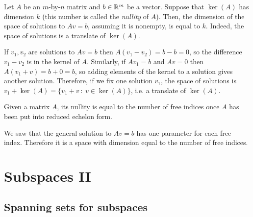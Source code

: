 \documentclass{article}
\begin{document}
\begin{Theorem}
Let \(A\) be an \(m\)-by-\(n\) matrix and \(b\in\mathbb{R}^m\) be a
vector. Suppose that \(\ker(A)\) has dimension \(k\) (this number is
called the {\em nullity} of \(A\)). Then, the dimension of the space
of solutions to \(Av=b\), assuming it is nonempty, is equal to
\(k\). Indeed, the space of solutions is a translate of \(\ker(A)\).
\end{Theorem}
\begin{Proof}
If \(v_1,v_2\) are solutions to \(Av=b\) then \(A(v_1-v_2)=b-b=0\),
so the difference \(v_1-v_2\) is in the kernel of \(A\). Similarly,
if \(Av_1=b\) and \(Av=0\) then \(A(v_1+v)=b+0=b\), so adding
elements of the kernel to a solution gives another
solution. Therefore, if we fix one solution \(v_1\), the space of
solutions is \(v_1+\ker(A)=\{v_1+v\ :\ v\in\ker(A)\}\), i.e. a
translate of \(\ker(A)\). \qedhere


\end{Proof}
\begin{Theorem}\label{thm:nullity}
Given a matrix \(A\), its nullity is equal to the number of free
indices once \(A\) has been put into reduced echelon form.
\end{Theorem}
\begin{Proof}
We saw that the general solution to \(Av=b\) has one parameter for
each free index. Therefore it is a space with dimension equal to the
number of free indices. \qedhere


\end{Proof}
\clearpage
\section{Subspaces II}
\subsection{Spanning sets for subspaces}
\end{document}

